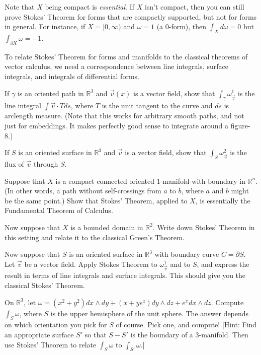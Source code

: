 \documentclass[12pt]{amsbook}
\newcommand{\R}{{\mathbb R}}
\theoremstyle{definition}
\begin{document}
Note that $X$ being compact is {\em essential}. 
If $X$ isn't compact, then you can still prove Stokes' Theorem for forms that
are compactly supported, but not for forms in general. For instance, 
if $X=[0,\infty)$ and 
$\omega =1$ (a 0-form), then $\int_X d\omega=0$ but $\int_{\partial X} \omega=-1$.

\smallskip

To relate Stokes' Theorem for forms and manifolds to the classical theorems
of vector calculus, we need a correspondence between line integrals, surface
integrals, and integrals of differential forms. 

 If $\gamma$ is an oriented path in $\R^3$
and $\vec v(x)$ is a vector field, show that $\int_\gamma
\omega^1_{\vec v}$ is the line integral $\int \vec v \cdot T ds$,
where $T$ is the unit tangent to the curve and $ds$ is arclength
measure. (Note that this works for arbitrary smooth paths, and not
just for embeddings. It makes perfectly good sense to integrate around 
a figure-8.)

\smallskip

 If $S$ is an oriented surface in $\R^3$ and 
$\vec v$ is a vector field, show that $\int_S \omega^2_{\vec v}$ is the 
flux of $\vec v$ through $S$.

\smallskip
 
 Suppose that $X$ is a compact connected oriented 
1-manifold-with-boundary 
in $\R^n$. (In other words, a path without self-crossings 
from $a$ to $b$, where $a$ and $b$ might
be the same point.) Show that Stokes' Theorem, applied to $X$, is essentially
the Fundamental Theorem of Calculus. 

\smallskip

 Now suppose that $X$ is a bounded domain in $\R^2$. 
Write down Stokes' Theorem in this setting and relate it to the classical
Green's Theorem.

\smallskip

 Now suppose that $S$ is an oriented surface in
$\R^3$ with boundary curve $C=\partial S$. Let $\vec v$ be a vector field. 
Apply Stokes Theorem to $\omega^1_{\vec v}$ and to $S$, and express the result
in terms of line integrals and surface integrals. This should give you the 
classical Stokes' Theorem. 

\smallskip

On $\R^3$, let $\omega = (x^2+y^2) dx \wedge dy + (x+ye^z) dy
\wedge dz + e^x dx \wedge dz.$ Compute $\int_S \omega$, where $S$ is the 
upper hemisphere of the unit sphere. The answer depends on which orientation
you pick for $S$ of course. Pick one, and compute! [Hint: Find an appropriate 
surface $S'$ so that $S-S'$ is the boundary of a 3-manifold. 
Then use Stokes' Theorem
to relate $\int_S \omega$ to $\int_{S'} \omega$.] 
\end{document}
